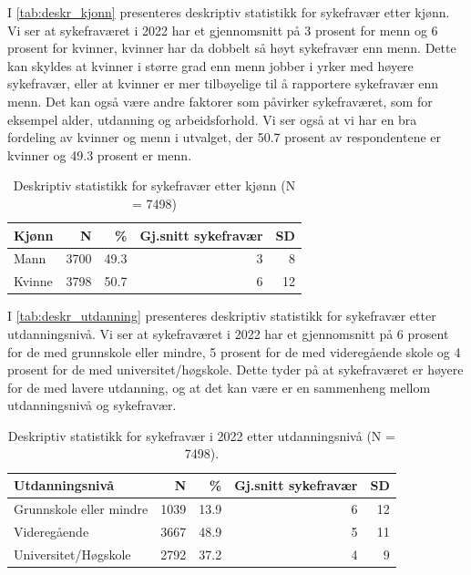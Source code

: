 \documentclass[
  12pt,
  a4paper,
  DIV=11,
  numbers=noendperiod]{scrartcl}
\begin{document}
I \autoref{tab:deskr_kjonn} presenteres deskriptiv statistikk for
sykefravær etter kjønn. Vi ser at sykefraværet i 2022 har et
gjennomsnitt på 3 prosent for menn og 6 prosent for kvinner, kvinner har
da dobbelt så høyt sykefravær enn menn. Dette kan skyldes at kvinner i
større grad enn menn jobber i yrker med høyere sykefravær, eller at
kvinner er mer tilbøyelige til å rapportere sykefravær enn menn. Det kan
også være andre faktorer som påvirker sykefraværet, som for eksempel
alder, utdanning og arbeidsforhold. Vi ser også at vi har en bra
fordeling av kvinner og menn i utvalget, der 50.7 prosent av
respondentene er kvinner og 49.3 prosent er menn.

\begin{table}[ht]
\centering
\begin{tabular}{lrrrr}
\toprule
Kjønn   & N   & \%   & Gj.snitt sykefravær & SD    \\
\midrule
Mann    & 3700 & 49.3 & 3               & 8 \\
Kvinne  & 3798 & 50.7 & 6               & 12 \\
\bottomrule
\end{tabular}
\caption{Deskriptiv statistikk for sykefravær etter kjønn (N = 7498)}
\label{tab:deskr_kjonn}
\end{table}

I \autoref{tab:deskr_utdanning} presenteres deskriptiv statistikk for
sykefravær etter utdanningsnivå. Vi ser at sykefraværet i 2022 har et
gjennomsnitt på 6 prosent for de med grunnskole eller mindre, 5 prosent
for de med videregående skole og 4 prosent for de med
universitet/høgskole. Dette tyder på at sykefraværet er høyere for de
med lavere utdanning, og at det kan være er en sammenheng mellom
utdanningsnivå og sykefravær.

\begin{table}[ht]
\centering
\begin{tabular}{lrrrr}
\toprule
Utdanningsnivå                & N    & \%   & Gj.snitt sykefravær & SD   \\
\midrule
Grunnskole eller mindre       & 1039 & 13.9 & 6                    & 12   \\
Videregående                   & 3667 & 48.9 & 5                    & 11   \\
Universitet/Høgskole           & 2792 & 37.2 & 4                    & 9    \\
\bottomrule
\end{tabular}
\caption{Deskriptiv statistikk for sykefravær i 2022 etter utdanningsnivå (N = 7498).}
\label{tab:deskr_utdanning}
\end{table}
\end{document}
